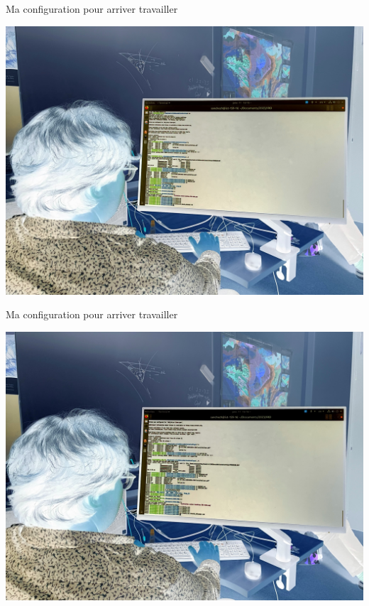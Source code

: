\documentclass{beamer}
\begin{document}
\begin{frame}
 {Ma configuration pour arriver travailler}
 
  \includegraphics[width=1\linewidth]{images/photos/5/image5_neg.jpeg}  
 
\end{frame}

\begin{frame}
 {Ma configuration pour arriver travailler}
 
  \includegraphics[width=1\linewidth]{images/photos/5/image4_neg.jpeg}  
 
\end{frame}
\end{document}
